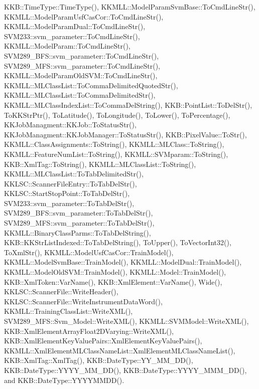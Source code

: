 K\+K\+B\+::\+Time\+Type\+::\+Time\+Type(), K\+K\+M\+L\+L\+::\+Model\+Param\+Svm\+Base\+::\+To\+Cmd\+Line\+Str(), K\+K\+M\+L\+L\+::\+Model\+Param\+Usf\+Cas\+Cor\+::\+To\+Cmd\+Line\+Str(), K\+K\+M\+L\+L\+::\+Model\+Param\+Dual\+::\+To\+Cmd\+Line\+Str(), S\+V\+M233\+::svm\+\_\+parameter\+::\+To\+Cmd\+Line\+Str(), K\+K\+M\+L\+L\+::\+Model\+Param\+::\+To\+Cmd\+Line\+Str(), S\+V\+M289\+\_\+\+B\+F\+S\+::svm\+\_\+parameter\+::\+To\+Cmd\+Line\+Str(), S\+V\+M289\+\_\+\+M\+F\+S\+::svm\+\_\+parameter\+::\+To\+Cmd\+Line\+Str(), K\+K\+M\+L\+L\+::\+Model\+Param\+Old\+S\+V\+M\+::\+To\+Cmd\+Line\+Str(), K\+K\+M\+L\+L\+::\+M\+L\+Class\+List\+::\+To\+Comma\+Delimited\+Quoted\+Str(), K\+K\+M\+L\+L\+::\+M\+L\+Class\+List\+::\+To\+Comma\+Delimited\+Str(), K\+K\+M\+L\+L\+::\+M\+L\+Class\+Index\+List\+::\+To\+Comma\+Del\+String(), K\+K\+B\+::\+Point\+List\+::\+To\+Del\+Str(), To\+K\+K\+Str\+Ptr(), To\+Latitude(), To\+Longitude(), To\+Lower(), To\+Percentage(), K\+K\+Job\+Managment\+::\+K\+K\+Job\+::\+To\+Status\+Str(), K\+K\+Job\+Managment\+::\+K\+K\+Job\+Manager\+::\+To\+Status\+Str(), K\+K\+B\+::\+Pixel\+Value\+::\+To\+Str(), K\+K\+M\+L\+L\+::\+Class\+Assignments\+::\+To\+String(), K\+K\+M\+L\+L\+::\+M\+L\+Class\+::\+To\+String(), K\+K\+M\+L\+L\+::\+Feature\+Num\+List\+::\+To\+String(), K\+K\+M\+L\+L\+::\+S\+V\+Mparam\+::\+To\+String(), K\+K\+B\+::\+Xml\+Tag\+::\+To\+String(), K\+K\+M\+L\+L\+::\+M\+L\+Class\+List\+::\+To\+String(), K\+K\+M\+L\+L\+::\+M\+L\+Class\+List\+::\+To\+Tab\+Delimited\+Str(), K\+K\+L\+S\+C\+::\+Scanner\+File\+Entry\+::\+To\+Tab\+Del\+Str(), K\+K\+L\+S\+C\+::\+Start\+Stop\+Point\+::\+To\+Tab\+Del\+Str(), S\+V\+M233\+::svm\+\_\+parameter\+::\+To\+Tab\+Del\+Str(), S\+V\+M289\+\_\+\+B\+F\+S\+::svm\+\_\+parameter\+::\+To\+Tab\+Del\+Str(), S\+V\+M289\+\_\+\+M\+F\+S\+::svm\+\_\+parameter\+::\+To\+Tab\+Del\+Str(), K\+K\+M\+L\+L\+::\+Binary\+Class\+Parms\+::\+To\+Tab\+Del\+String(), K\+K\+B\+::\+K\+K\+Str\+List\+Indexed\+::\+To\+Tab\+Del\+String(), To\+Upper(), To\+Vector\+Int32(), To\+Xml\+Str(), K\+K\+M\+L\+L\+::\+Model\+Usf\+Cas\+Cor\+::\+Train\+Model(), K\+K\+M\+L\+L\+::\+Model\+Svm\+Base\+::\+Train\+Model(), K\+K\+M\+L\+L\+::\+Model\+Dual\+::\+Train\+Model(), K\+K\+M\+L\+L\+::\+Model\+Old\+S\+V\+M\+::\+Train\+Model(), K\+K\+M\+L\+L\+::\+Model\+::\+Train\+Model(), K\+K\+B\+::\+Xml\+Token\+::\+Var\+Name(), K\+K\+B\+::\+Xml\+Element\+::\+Var\+Name(), Wide(), K\+K\+L\+S\+C\+::\+Scanner\+File\+::\+Write\+Header(), K\+K\+L\+S\+C\+::\+Scanner\+File\+::\+Write\+Instrument\+Data\+Word(), K\+K\+M\+L\+L\+::\+Training\+Class\+List\+::\+Write\+X\+M\+L(), S\+V\+M289\+\_\+\+M\+F\+S\+::\+Svm\+\_\+\+Model\+::\+Write\+X\+M\+L(), K\+K\+M\+L\+L\+::\+S\+V\+M\+Model\+::\+Write\+X\+M\+L(), K\+K\+B\+::\+Xml\+Element\+Array\+Float2\+D\+Varying\+::\+Write\+X\+M\+L(), K\+K\+B\+::\+Xml\+Element\+Key\+Value\+Pairs\+::\+Xml\+Element\+Key\+Value\+Pairs(), K\+K\+M\+L\+L\+::\+Xml\+Element\+M\+L\+Class\+Name\+List\+::\+Xml\+Element\+M\+L\+Class\+Name\+List(), K\+K\+B\+::\+Xml\+Tag\+::\+Xml\+Tag(), K\+K\+B\+::\+Date\+Type\+::\+Y\+Y\+\_\+\+M\+M\+\_\+\+D\+D(), K\+K\+B\+::\+Date\+Type\+::\+Y\+Y\+Y\+Y\+\_\+\+M\+M\+\_\+\+D\+D(), K\+K\+B\+::\+Date\+Type\+::\+Y\+Y\+Y\+Y\+\_\+\+M\+M\+M\+\_\+\+D\+D(), and K\+K\+B\+::\+Date\+Type\+::\+Y\+Y\+Y\+Y\+M\+M\+D\+D().


